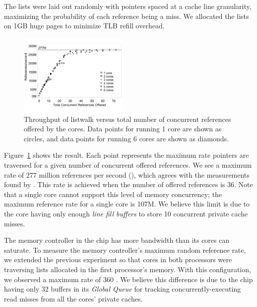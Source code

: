 \documentclass[10pt,nocopyrightspace,preprint]{sigplanconf}
\begin{document}
The lists were laid out randomly with pointers spaced at a cache line granularity, maximizing
the probability of each reference being a miss. We allocated the lists
on 1GB huge pages to minimize TLB refill overhead.

\begin{figure}[t]
  \vspace{-.1in}
	\begin{center}
		\includegraphics[width=0.47\textwidth]{figures/multi-listwalk-totalconc-edited.pdf}
	\end{center}
	\caption{Throughput of listwalk versus total number of
          concurrent references offered by the cores. Data points for
          running 1 core are shown as circles, and data points for
          running 6 cores are shown as diamonds. 
        }
	\label{fig:listwalk-totalconc}
\end{figure}

Figure~\ref{fig:listwalk-totalconc} shows the result. Each point represents
the maximum rate pointers are traversed for a given number of
concurrent offered references. We see a maximum rate of 277 million references per second (\mrps), which agrees with the measurements found by \cite{Mandal:2010}. This rate is achieved when the number of offered references is 36. Note that a single core cannot support this level of
memory concurrency; the maximum reference rate for a single core is
107M. We believe this limit is due to the core having only enough {\em line fill
  buffers} \cite{nehalem:arch} to store 10 concurrent private cache misses.

The memory controller in the chip has more bandwidth than its
cores can saturate. To measure the memory controller's maximum random
reference rate, we extended the previous experiment so that cores in
both processors were traversing lists allocated in the first processor's
memory. With this configuration, we observed a maximum rate of 360
\mrps. We believe this difference is due to the chip having only 32 buffers in its {\em Global Queue} \cite{nehalem:perf} for tracking concurrently-executing read misses from all the cores' private caches.
\end{document}
